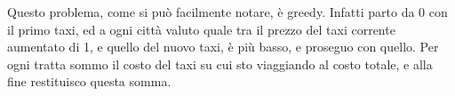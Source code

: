 
Questo problema, come si può facilmente notare, è greedy. Infatti parto da 0 con il primo taxi, ed a ogni città valuto quale tra il prezzo del taxi corrente aumentato di 1, e quello del nuovo taxi, è più basso, e proseguo con quello. Per ogni tratta sommo il costo del taxi su cui sto viaggiando al costo totale, e alla fine restituisco questa somma.\itemize

\colorbox{white}{} 